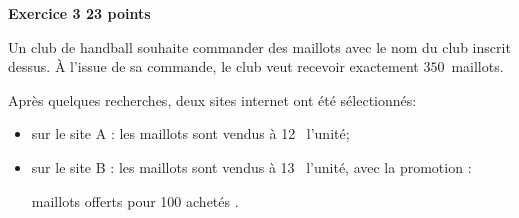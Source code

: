 \documentclass[11pt]{article}
\newcommand{\euro}{\eurologo{}}
\begin{document}
\bigskip

\textbf{\large Exercice 3 \hfill 23 points}

\medskip

Un club de handball souhaite commander des maillots avec le nom du club inscrit dessus. À l'issue de sa commande, le club veut recevoir exactement $350$~maillots.

Après quelques recherches, deux sites internet ont été sélectionnés:

\setlength\parindent{1cm}
\begin{itemize}
\item[$\bullet~~$] sur le site A : les maillots sont vendus à 12~\euro{} l'unité;
\item[$\bullet~~$] sur le site B : les maillots sont vendus à 13~\euro{} l'unité, avec la promotion :

\begin{center} maillots offerts pour 100 achetés \fg.\end{center}
\end{itemize}
\setlength\parindent{0cm}

\medskip
\end{document}
